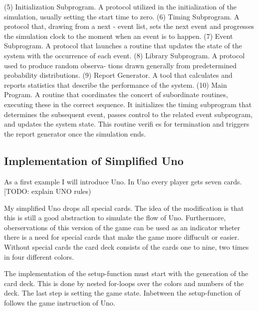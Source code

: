 (5) Initialization Subprogram. A protocol utilized in the initialization of
the simulation, usually setting the start time to zero.
(6) Timing Subprogram. A protocol that, drawing from a next - event list,
sets the next event and progresses the simulation clock to the moment
when an event is to happen.
(7) Event Subprogram. A protocol that launches a routine that updates
the state of the system with the occurrence of each event.
(8) Library Subprogram. A protocol used to produce random observa-
tions drawn generally from predetermined probability distributions.
(9) Report Generator. A tool that calculates and reports statistics that
describe the performance of the system.
(10) Main Program. A routine that coordinates the concert of subordinate
routines, executing these in the correct sequence. It initializes the
timing subprogram that determines the subsequent event, passes
control to the related event subprogram, and updates the system state.
This routine verifi es for termination and triggers the report generator
once the simulation ends.


  




\subsection{Implementation of Simplified Uno}

As a first example I will introduce Uno. In Uno every player gets seven cards. [TODO: explain UNO rules)


My simplified Uno drops all special cards. The idea of the modification is that this is still a good abstraction to simulate the flow of Uno. Furthermore, oberservations of this version of the game can be used as an indicator wheter there is a need for special cards that make the game more diffucult or easier. 
Without special cards the card deck consists of the cards one to nine, two times in four different colors. 

The implementation of the setup-function must start with the generation of the card deck. This is done by nested for-loops over the colors and numbers of the deck.  The last step is setting the game state.  Inbetween the setup-function of follows the game instruction of Uno. 


